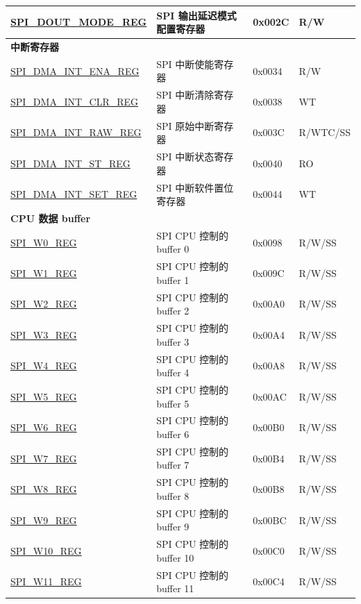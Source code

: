 \begin{longtable}{ | p{6cm} | p{6.6cm} | p{1.3cm} | p{1.7cm} | }
\hyperref[regdesc:SPIDOUTMODEREG]{SPI\_DOUT\_MODE\_REG} & SPI 输出延迟模式配置寄存器 & 0x002C & R/W \\ \hline
\multicolumn{4}{|l|}{\textbf{中断寄存器}} \\ \hline
\hyperref[regdesc:SPIDMAINTENAREG]{SPI\_DMA\_INT\_ENA\_REG} & SPI 中断使能寄存器 & 0x0034 & R/W \\ \hline
\hyperref[regdesc:SPIDMAINTCLRREG]{SPI\_DMA\_INT\_CLR\_REG} & SPI 中断清除寄存器 & 0x0038 & WT \\ \hline
\hyperref[regdesc:SPIDMAINTRAWREG]{SPI\_DMA\_INT\_RAW\_REG} & SPI 原始中断寄存器 & 0x003C & R/WTC/SS \\ \hline
\hyperref[regdesc:SPIDMAINTSTREG]{SPI\_DMA\_INT\_ST\_REG} & SPI 中断状态寄存器 & 0x0040 & RO \\ \hline
\hyperref[regdesc:SPIDMAINTSETREG]{SPI\_DMA\_INT\_SET\_REG} & SPI 中断软件置位寄存器 & 0x0044 & WT \\ \hline
\multicolumn{4}{|l|}{\textbf{CPU 数据 buffer}} \\ \hline
\hyperref[regdesc:SPIW0REG]{SPI\_W0\_REG} & SPI CPU 控制的 buffer 0 & 0x0098 & R/W/SS \\ \hline
\hyperref[regdesc:SPIW1REG]{SPI\_W1\_REG} & SPI CPU 控制的 buffer 1 & 0x009C & R/W/SS \\ \hline
\hyperref[regdesc:SPIW2REG]{SPI\_W2\_REG} & SPI CPU 控制的 buffer 2 & 0x00A0 & R/W/SS \\ \hline
\hyperref[regdesc:SPIW3REG]{SPI\_W3\_REG} & SPI CPU 控制的 buffer 3 & 0x00A4 & R/W/SS \\ \hline
\hyperref[regdesc:SPIW4REG]{SPI\_W4\_REG} & SPI CPU 控制的 buffer 4 & 0x00A8 & R/W/SS \\ \hline
\hyperref[regdesc:SPIW5REG]{SPI\_W5\_REG} & SPI CPU 控制的 buffer 5 & 0x00AC & R/W/SS \\ \hline
\hyperref[regdesc:SPIW6REG]{SPI\_W6\_REG} & SPI CPU 控制的 buffer 6 & 0x00B0 & R/W/SS \\ \hline
\hyperref[regdesc:SPIW7REG]{SPI\_W7\_REG} & SPI CPU 控制的 buffer 7 & 0x00B4 & R/W/SS \\ \hline
\hyperref[regdesc:SPIW8REG]{SPI\_W8\_REG} & SPI CPU 控制的 buffer 8 & 0x00B8 & R/W/SS \\ \hline
\hyperref[regdesc:SPIW9REG]{SPI\_W9\_REG} & SPI CPU 控制的 buffer 9 & 0x00BC & R/W/SS \\ \hline
\hyperref[regdesc:SPIW10REG]{SPI\_W10\_REG} & SPI CPU 控制的 buffer 10 & 0x00C0 & R/W/SS \\ \hline
\hyperref[regdesc:SPIW11REG]{SPI\_W11\_REG} & SPI CPU 控制的 buffer 11 & 0x00C4 & R/W/SS \\ \hline

\end{longtable}
